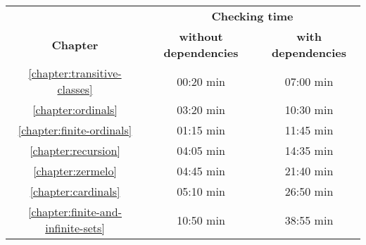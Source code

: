 \documentclass[12pt,oneside]{book}
\begin{document}
  \begin{center}
    \begin{tabular}{c|c|c}

      & \multicolumn{2}{c}{\textbf{Checking time}}
      \\
      \textbf{Chapter}
      & \textbf{without dependencies}     & \textbf{with dependencies}
      \\ \hline
      \ref{chapter:transitive-classes}
      & 00:20 min                         & 07:00 min
      \\
      \ref{chapter:ordinals}
      & 03:20 min                         & 10:30 min
      \\
      \ref{chapter:finite-ordinals}
      & 01:15 min                         & 11:45 min
      \\
      \ref{chapter:recursion}
      & 04:05 min                         & 14:35 min
      \\
      \ref{chapter:zermelo}
      & 04:45 min                         & 21:40 min
      \\
      \ref{chapter:cardinals}
      & 05:10 min                         & 26:50 min
      \\
      \ref{chapter:finite-and-infinite-sets}
      & 10:50 min                         & 38:55 min
    \end{tabular}
  \end{center}

  
  
  
  
  
  
  
\end{document}
